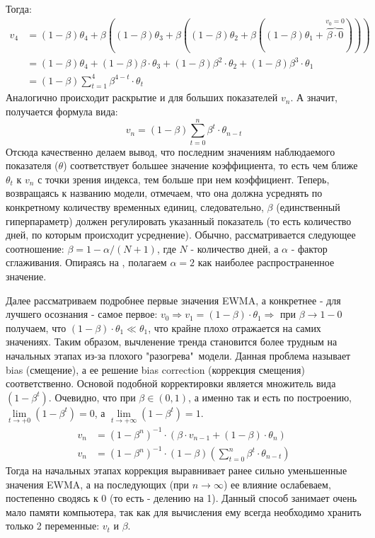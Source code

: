 Тогда:
\begin{equation}
	\begin{split}
		v_4 & =  (1 - \beta) \theta_4 + \beta ((1 - \beta) \theta_3 + \beta ((1 - \beta) \theta_2 + \beta((1 - \beta) \theta_1 + \overbrace{\beta \cdot 0}^{v_0 = 0})))\\
		& = (1 - \beta) \theta_4 + (1 - \beta) \beta \cdot \theta_3 + (1 - \beta) \beta^2 \cdot \theta_2 + (1 - \beta) \beta^3 \cdot \theta_1\\
		& = (1 - \beta) \sum_{t = 1}^4 \beta^{4 - t} \cdot \theta_t
	\end{split}
\end{equation}
Аналогично происходит раскрытие и для больших показателей $v_n$. А значит, получается формула вида:
\begin{equation}
	v_n = (1 - \beta) \sum_{t = 0}^n \beta^t \cdot \theta_{n - t}
\end{equation}
Отсюда качественно делаем вывод, что последним значениям наблюдаемого показателя ($\theta$) соответствует большее значение коэффициента, то есть чем ближе $\theta_{t}$ к $v_n$ с точки зрения индекса, тем больше при нем коэффициент. Теперь, возвращаясь к названию модели, отмечаем, что она должна усреднять по конкретному количеству временных единиц, следовательно, $\beta$ (единственный гиперпараметр) должен регулировать указанный показатель (то есть количество дней, по которым происходит усреднение). Обычно, рассматривается следующее соотношение: $\beta = 1 - \alpha / (N + 1)$, где $N$ - количество дней, а $\alpha$ - фактор сглаживания. Опираясь на \cite{ewma}, полагаем $\alpha = 2$ как наиболее распространенное значение.

Далее рассматриваем подробнее первые значения EWMA, а конкретнее - для лучшего осознания - самое первое: $v_0 \Rightarrow v_1 = (1 - \beta) \cdot \theta_1 \Rightarrow$ при $\beta \to 1 - 0$ получаем, что $(1 - \beta) \cdot \theta_1 \ll \theta_1$, что крайне плохо отражается на самих значениях. Таким образом, вычленение тренда становится более трудным на начальных этапах из-за плохого "разогрева"\ модели. Данная проблема называет bias (смещение), а ее решение bias correction (коррекция смещения) соответственно. Основой подобной корректировки является множитель вида $(1 - \beta^t)$. Очевидно, что при $\beta \in (0,1)$, а именно так и есть по построению, $\lim\limits_{t \to +0}(1 - \beta^t) = 0$, а $\lim\limits_{t \to +\infty}(1 - \beta^t) = 1$.
\begin{equation}
	\begin{split}
		v_n & = (1 - \beta^n)^{-1} \cdot (\beta \cdot v_{n - 1} + (1 - \beta) \cdot \theta_n)\\
		v_n & = (1 - \beta^n)^{-1} \cdot (1 - \beta) \left(\sum_{t = 0}^n \beta^t \cdot \theta_{n - t}\right)
	\end{split}
\end{equation}
Тогда на начальных этапах коррекция выравнивает ранее сильно уменьшенные значения EWMA, а на последующих (при $n \to \infty$) ее влияние ослабеваем, постепенно сводясь к 0 (то есть - делению на 1). Данный способ занимает очень мало памяти компьютера, так как для вычисления ему всегда необходимо хранить только 2 переменные: $v_t$ и $\beta$.

